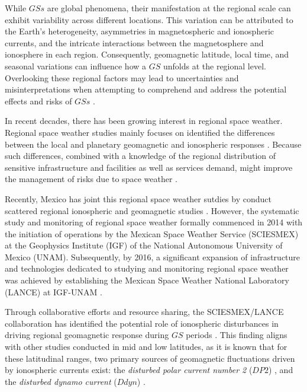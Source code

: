 \documentclass[a4paper,fleqn]{cas-dc}
\begin{document}
While $GSs$ are global phenomena, their manifestation at the regional scale can exhibit variability across different locations. This variation can be attributed to the Earth's heterogeneity, asymmetries in magnetospheric and ionospheric currents, and the intricate interactions between the magnetosphere and ionosphere in each region. Consequently, geomagnetic latitude, local time, and seasonal variations can influence how a $GS$ unfolds at the regional level. Overlooking these regional factors may lead to uncertainties and misinterpretations when attempting to comprehend and address the potential effects and risks of $GSs$ \citep{gic_intro, gic, gic_2, gic_brazil}.

In recent decades, there has been growing interest in regional space weather. Regional space weather studies mainly focuses on identified the differences between the local and planetary geomagnetic and ionospheric responses \citep[see][and references there in]{gic_czech, gic_brazil,gic}. Because such differences, combined with a knowledge of the regional distribution of sensitive infrastructure and facilities as well as services demand, might improve the management of risks due to space weather \citep{schrijver2015}.

Recently, Mexico has joint this regional space weather sutdies by conduct scattered regional ionospheric and geomagnetic studies \citep[\emph{e.g.}][]{MEXART2003, MEXART2005, MEXART_iono_dist, MEXART_iono_dist2, mario_rodriguez2011, lopez-montes, mario_rodriguez2014, iono-resp2016, lenica}. However, the systematic study and monitoring of regional space weather formally commenced in 2014 with the initiation of operations by the Mexican Space Weather Service (SCIESMEX) at the Geophysics Institute (IGF) of the National Autonomous University of Mexico (UNAM). Subsequently, by 2016, a significant expansion of infrastructure and technologies dedicated to studying and monitoring regional space weather was achieved by establishing the Mexican Space Weather National Laboratory (LANCE) at IGF-UNAM \citep{sciesmex_art}.

Through collaborative efforts and resource sharing, the SCIESMEX/LANCE collaboration has identified the potential role of ionospheric disturbances in driving regional geomagnetic response during $GS$ periods \citep[see][]{esmeralda, dramaria_1, dramaria7, P-corona1, P-corona2}. This finding aligns with other studies conducted in mid and low latitudes, as it is known that for these latitudinal ranges, two primary sources of geomagnetic fluctuations driven by ionospheric currents exist: the \emph{disturbed polar current number 2} ($DP2$) \citep{nishida_68_coherence, nishida_68_fluctuations, nishida_66_knee}, and the \emph{disturbed dynamo current} ($Ddyn$) \citep{blanc_ddyn}.
\end{document}
